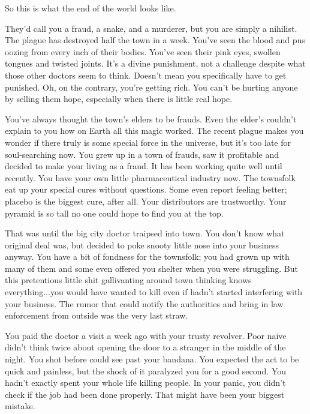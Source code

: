 \documentclass[char]{guildcamp4}
\begin{document}
\name{\cCon{}}

So this is what the end of the world looks like.

They'd call you a fraud, a snake, and a murderer, but you are simply a nihilist. The plague has destroyed half the town in a week. You've seen the blood and pus oozing from every inch of their bodies. You've seen their pink eyes, swollen tongues and twisted joints. It's a divine punishment, not a challenge despite what those other doctors seem to think. Doesn't mean you specifically have to get punished. Oh, on the contrary, you're getting rich. You can't be hurting anyone by selling them hope, especially when there is little real hope.

You've always thought the town's elders to be frauds. Even the elder's \cApprentice{\offspring} couldn't explain to you how on Earth all this magic worked. The recent plague makes you wonder if there truly is some special force in the universe, but it's too late for soul-searching now. You grew up in a town of frauds, saw it profitable and decided to make your living as a fraud. It has been working quite well until recently. You have your own little pharmaceutical industry now. The townsfolk eat up your special cures without questions. Some even report feeling better; placebo is the biggest cure, after all. Your distributors are trustworthy. Your pyramid is so tall no one could hope to find you at the top.

That was until the big city doctor traipsed into town. You don't know what \cOutsider{\their} original deal was, but \cOutsider{\they} decided to poke \cOutsider{\their} snooty little nose into your business anyway. You have a bit of fondness for the townsfolk; you had grown up with many of them and some even offered you shelter when you were struggling. But this pretentious little shit gallivanting around town thinking \cOutsider{\they} knows everything...you would have wanted to kill \cOutsider{\them} even if \cOutsider{\they} hadn't started interfering with your business. The rumor that \cOutsider{\they} could notify the authorities and bring in law enforcement from outside was the very last straw.

You paid the doctor a visit a week ago with your trusty revolver. Poor naive \cOutsider{\human} didn't think twice about opening the door to a stranger in the middle of the night. You shot \cOutsider{\them} before \cOutsider{\they} could see past your bandana. You expected the act to be quick and painless, but the shock of it paralyzed you for a good second. You hadn't exactly spent your whole life killing people. In your panic, you didn't check if the job had been done properly. That might have been your biggest mistake.
\end{document}
